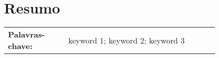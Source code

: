 
\section*{Resumo}


\lipsum[2]


\vfill

\begin{tabular}{p{0.24\linewidth} p{0.6\linewidth}}
\textbf{\Large Palavras-chave:} & keyword 1; keyword  2; keyword 3  
\end{tabular}  \\